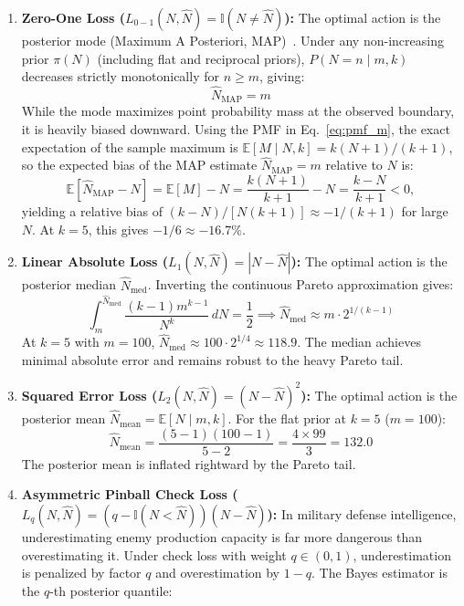\documentclass[10pt,a4paper]{article}
\begin{document}
\begin{enumerate}
    \item \textbf{Zero-One Loss ($L_{0-1}(N, \hat{N}) = \mathbb{I}(N \ne \hat{N})$):} The optimal action is the posterior mode (Maximum A Posteriori, MAP)~\cite{berger1985,robert2007}. Under any non-increasing prior $\pi(N)$ (including flat and reciprocal priors), $P(N = n \mid m, k)$ decreases strictly monotonically for $n \ge m$, giving:
    \begin{equation}
    \hat{N}_{\text{MAP}} = m
    \end{equation}
    While the mode maximizes point probability mass at the observed boundary, it is heavily biased downward. Using the PMF in Eq.~\eqref{eq:pmf_m}, the exact expectation of the sample maximum is $\mathbb{E}[M \mid N, k] = k(N+1)/(k+1)$, so the expected bias of the MAP estimate $\hat{N}_{\text{MAP}} = m$ relative to $N$ is:
    \begin{equation}
    \mathbb{E}[\hat{N}_{\text{MAP}} - N] = \mathbb{E}[M] - N = \frac{k(N+1)}{k+1} - N = \frac{k - N}{k+1} < 0,
    \end{equation}
    yielding a relative bias of $(k-N)/[N(k+1)] \approx -1/(k+1)$ for large $N$. At $k = 5$, this gives $-1/6 \approx -16.7\%$.
    \item \textbf{Linear Absolute Loss ($L_1(N, \hat{N}) = |N - \hat{N}|$):} The optimal action is the posterior median $\hat{N}_{\text{med}}$. Inverting the continuous Pareto approximation gives:
    \begin{equation}
    \int_m^{\hat{N}_{\text{med}}} \frac{(k-1) m^{k-1}}{N^k} \, dN = \frac{1}{2} \implies \hat{N}_{\text{med}} \approx m \cdot 2^{1/(k-1)}
    \label{eq:median_formula}
    \end{equation}
    At $k=5$ with $m=100$, $\hat{N}_{\text{med}} \approx 100 \cdot 2^{1/4} \approx 118.9$. The median achieves minimal absolute error and remains robust to the heavy Pareto tail.
    \item \textbf{Squared Error Loss ($L_2(N, \hat{N}) = (N - \hat{N})^2$):} The optimal action is the posterior mean $\hat{N}_{\text{mean}} = \mathbb{E}[N \mid m, k]$. For the flat prior at $k=5$ ($m=100$):
    \begin{equation}
    \hat{N}_{\text{mean}} = \frac{(5-1)(100-1)}{5-2} = \frac{4 \times 99}{3} = 132.0
    \end{equation}
    The posterior mean is inflated rightward by the Pareto tail.
    \item \textbf{Asymmetric Pinball Check Loss ($L_q(N, \hat{N}) = (q - \mathbb{I}(N < \hat{N}))(N - \hat{N})$):} In military defense intelligence, underestimating enemy production capacity is far more dangerous than overestimating it. Under check loss with weight $q \in (0, 1)$, underestimation is penalized by factor $q$ and overestimation by $1-q$. The Bayes estimator is the $q$-th posterior quantile:

\end{enumerate}
\end{document}
